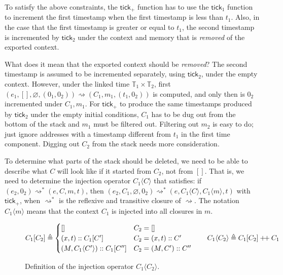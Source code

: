 \documentclass[acmsmall,review]{acmart}\settopmatter{printfolios=true,printccs=false,printacmref=false}
\theoremstyle{definition}
\newcommand*{\cons}{::}
\newcommand*{\Time}{\mathbb{T}}
\newcommand*{\mem}{m}
\newcommand*{\doubleplus}{\ensuremath{\mathbin{+\mkern-3mu+}}}
\newcommand*{\tick}{\mathsf{tick}}
\newcommand*{\mapinject}[2]{{#1}[{#2}]}
\newcommand*{\inject}[2]{{#1}\langle{#2}\rangle}
\begin{document}
To satisfy the above constraints, the $\tick_+$ function has to use the $\tick_1$ function to increment the first timestamp when the first timestamp is less than $t_1$.
Also, in the case that the first timestamp is greater or equal to $t_1$, the second timestamp is incremented by $\tick_2$ under the context and memory that is \emph{removed} of the exported context.

What does it mean that the exported context should be \emph{removed}?
The second timestamp is assumed to be incremented separately, using $\tick_2$, under the empty context.
However, under the linked time $\Time_1\times\Time_2$, first $(e_1,[],\varnothing,(0_1,0_2))\rightsquigarrow(C_1,\mem_1,(t_1,0_2))$ is computed, and only then is $0_2$ incremented under $C_1,\mem_1$.
For $\tick_+$ to produce the same timestamps produced by $\tick_2$ under the empty initial conditions, $C_1$ has to be dug out from the bottom of the stack and $\mem_1$ must be filtered out.
Filtering out $\mem_2$ is easy to do; just ignore addresses with a timestamp different from $t_1$ in the first time component.
Digging out $C_2$ from the stack needs more consideration.

To determine what parts of the stack should be deleted, we need to be able to describe what $C$ will look like if it started from $C_2$, not from $[]$.
That is, we need to determine the injection operator $\inject{C_1}{C}$ that satisfies:
if $(e_2,0_2)\rightsquigarrow^*(e,C,\mem,t)$, then $(e_2,C_1,\varnothing,0_2)\rightsquigarrow^*(e,\inject{C_1}{C},\inject{C_1}{\mem},t)$ with $\tick_+$, when $\rightsquigarrow^*$ is the reflexive and transitive closure of $\rightsquigarrow$.
The notation $\inject{C_1}{\mem}$ means that the context $C_1$ is injected into all closures in $\mem$.

\begin{figure}[h!]
  \footnotesize
  \[
    \mapinject{C_{1}}{C_{2}}\triangleq
    \begin{cases}
      []                                                 & C_{2}=[]              \\
      (x, t)\cons\mapinject{C_{1}}{C'}                   & C_{2}=(x,t)\cons C'   \\
      (M, \inject{C_{1}}{C'})\cons\mapinject{C_{1}}{C''} & C_{2}=(M,C')\cons C''
    \end{cases}
    \qquad
    \inject{C_{1}}{C_{2}}\triangleq \mapinject{C_{1}}{C_{2}}\doubleplus C_{1}
  \]
  \caption{Definition of the injection operator $\inject{C_1}{C_2}$.}
  \label{fig:concinject}
\end{figure}
\end{document}
